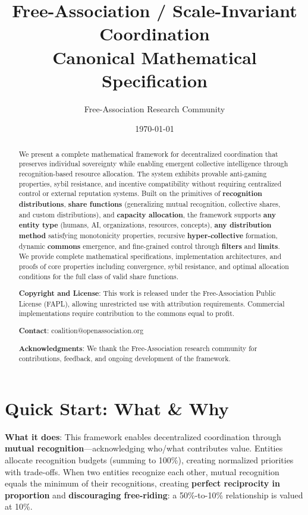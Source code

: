 \documentclass[11pt,a4paper]{article}
\title{\textbf{Free-Association / Scale-Invariant Coordination}\\
\large Canonical Mathematical Specification}
\author{Free-Association Research Community}
\date{\today}
\theoremstyle{definition}
\theoremstyle{remark}
\begin{document}
\maketitle

\begin{abstract}
We present a complete mathematical framework for decentralized coordination that preserves individual sovereignty while enabling emergent collective intelligence through recognition-based resource allocation. The system exhibits provable anti-gaming properties, sybil resistance, and incentive compatibility without requiring centralized control or external reputation systems. Built on the primitives of \textbf{recognition distributions}, \textbf{share functions} (generalizing mutual recognition, collective shares, and custom distributions), and \textbf{capacity allocation}, the framework supports \textbf{any entity type} (humans, AI, organizations, resources, concepts), \textbf{any distribution method} satisfying monotonicity properties, recursive \textbf{hyper-collective} formation, dynamic \textbf{commons} emergence, and fine-grained control through \textbf{filters} and \textbf{limits}. We provide complete mathematical specifications, implementation architectures, and proofs of core properties including convergence, sybil resistance, and optimal allocation conditions for the full class of valid share functions.

\textbf{Copyright and License}: This work is released under the Free-Association Public License (FAPL), allowing unrestricted use with attribution requirements. Commercial implementations require contribution to the commons equal to profit.

\textbf{Contact}: coalition@openassociation.org

\textbf{Acknowledgments}: We thank the Free-Association research community for contributions, feedback, and ongoing development of the framework.
\end{abstract}

\tableofcontents
\newpage

\section{Quick Start: What \& Why}

\textbf{What it does}: This framework enables decentralized coordination through \textbf{mutual recognition}---acknowledging who/what contributes value. Entities allocate recognition budgets (summing to 100\%), creating normalized priorities with trade-offs. When two entities recognize each other, mutual recognition equals the minimum of their recognitions, creating \textbf{perfect reciprocity in proportion} and \textbf{discouraging free-riding}: a 50\%-to-10\% relationship is valued at 10\%.
\end{document}
